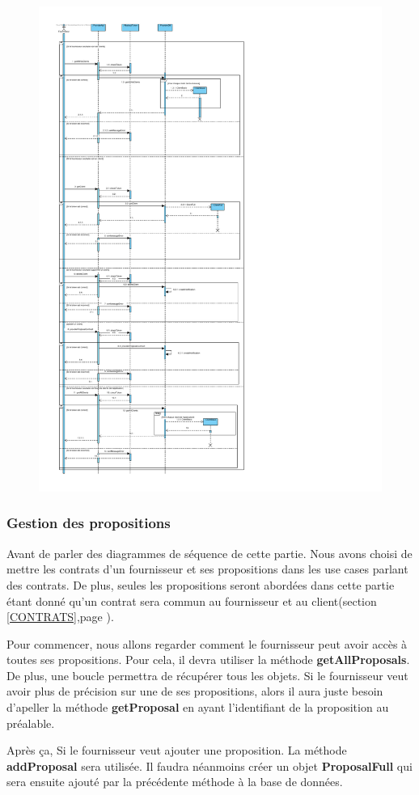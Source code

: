 \newpage
\begin{figure}[h]
    \centering
    \includegraphics[height = 1\textwidth]{Base/sequence/img/fournisseur/voir_ses_clients.pdf}
\end{figure}
\newpage
\subsubsection{Gestion des propositions}
\begin{flushleft}
Avant de parler des diagrammes de séquence de cette partie. Nous avons choisi de mettre les contrats d'un fournisseur et ses propositions dans les use cases parlant des contrats. De plus, seules les propositions seront abordées dans cette partie étant donné qu'un contrat sera commun au fournisseur et au client(section \ref{CONTRATS},page \pageref{CONTRATS}).
\end{flushleft}

\begin{flushleft}
Pour commencer, nous allons regarder comment le fournisseur peut avoir accès à toutes ses propositions. Pour cela, il devra utiliser la méthode \textbf{getAllProposals}. De plus, une boucle permettra de récupérer tous les objets. Si le fournisseur veut avoir plus de précision sur une de ses propositions, alors il aura juste besoin d'apeller la méthode \textbf{getProposal} en ayant l'identifiant de la proposition au préalable.
\end{flushleft}
\begin{flushleft}
Après ça, Si le fournisseur veut ajouter une proposition. La méthode \textbf{addProposal} sera utilisée. Il faudra néanmoins créer un objet \textbf{ProposalFull} qui sera ensuite ajouté par la précédente méthode à la base de données. 
\end{flushleft}


